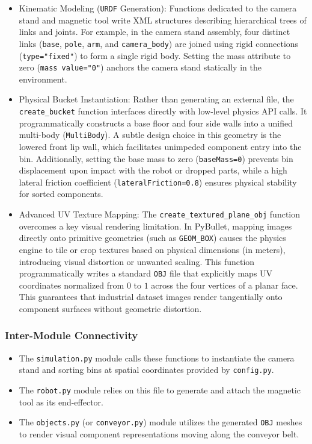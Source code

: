 \documentclass{article}
\begin{document}
\begin{itemize}
	\item Kinematic Modeling (\texttt{URDF} Generation): Functions dedicated to the camera stand and magnetic tool write XML structures describing hierarchical trees of links and joints. For example, in the camera stand assembly, four distinct links (\texttt{base}, \texttt{pole}, \texttt{arm}, and \texttt{camera\_body}) are joined using rigid connections (\texttt{type="fixed"}) to form a single rigid body. Setting the mass attribute to zero (\texttt{mass value="0"}) anchors the camera stand statically in the environment.
	
	\item Physical Bucket Instantiation: Rather than generating an external file, the \texttt{create\_bucket} function interfaces directly with low-level physics API calls. It programmatically constructs a base floor and four side walls into a unified multi-body (\texttt{MultiBody}). A subtle design choice in this geometry is the lowered front lip wall, which facilitates unimpeded component entry into the bin. Additionally, setting the base mass to zero (\texttt{baseMass=0}) prevents bin displacement upon impact with the robot or dropped parts, while a high lateral friction coefficient (\texttt{lateralFriction=0.8}) ensures physical stability for sorted components.
	
	\item Advanced UV Texture Mapping: The \texttt{create\_textured\_plane\_obj} function overcomes a key visual rendering limitation. In PyBullet, mapping images directly onto primitive geometries (such as \texttt{GEOM\_BOX}) causes the physics engine to tile or crop textures based on physical dimensions (in meters), introducing visual distortion or unwanted scaling. This function programmatically writes a standard \texttt{OBJ} file that explicitly maps UV coordinates normalized from $0$ to $1$ across the four vertices of a planar face. This guarantees that industrial dataset images render tangentially onto component surfaces without geometric distortion.
\end{itemize}

\subsubsection{Inter-Module Connectivity}
\begin{itemize}
	\item The \texttt{simulation.py} module calls these functions to instantiate the camera stand and sorting bins at spatial coordinates provided by \texttt{config.py}.
	\item The \texttt{robot.py} module relies on this file to generate and attach the magnetic tool as its end-effector.
	\item The \texttt{objects.py} (or \texttt{conveyor.py}) module utilizes the generated \texttt{OBJ} meshes to render visual component representations moving along the conveyor belt.
\end{itemize}
\end{document}
